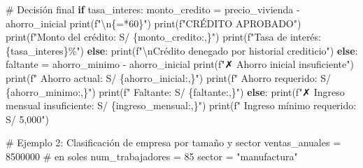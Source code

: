 \documentclass[
  doc,
  floatsintext,
  longtable,
  a4paper,
  nolmodern,
  notxfonts,
  notimes,
  12pt,
  colorlinks=true,linkcolor=blue,citecolor=blue,urlcolor=blue]{apa7}
\newenvironment{Shaded}{\begin{snugshade}}{\end{snugshade}}
\newcommand{\BuiltInTok}[1]{\textcolor[rgb]{0.00,0.23,0.31}{#1}}
\newcommand{\CharTok}[1]{\textcolor[rgb]{0.13,0.47,0.30}{#1}}
\newcommand{\CommentTok}[1]{\textcolor[rgb]{0.37,0.37,0.37}{#1}}
\newcommand{\ControlFlowTok}[1]{\textcolor[rgb]{0.00,0.23,0.31}{\textbf{#1}}}
\newcommand{\DecValTok}[1]{\textcolor[rgb]{0.68,0.00,0.00}{#1}}
\newcommand{\NormalTok}[1]{\textcolor[rgb]{0.00,0.23,0.31}{#1}}
\newcommand{\OperatorTok}[1]{\textcolor[rgb]{0.37,0.37,0.37}{#1}}
\newcommand{\SpecialCharTok}[1]{\textcolor[rgb]{0.37,0.37,0.37}{#1}}
\newcommand{\SpecialStringTok}[1]{\textcolor[rgb]{0.13,0.47,0.30}{#1}}
\newcommand{\StringTok}[1]{\textcolor[rgb]{0.13,0.47,0.30}{#1}}
\begin{document}
\begin{Shaded}
\begin{Highlighting}[]
        \CommentTok{\# Decisión final}
        \ControlFlowTok{if}\NormalTok{ tasa\_interes:}
\NormalTok{            monto\_credito }\OperatorTok{=}\NormalTok{ precio\_vivienda }\OperatorTok{{-}}\NormalTok{ ahorro\_inicial}
            \BuiltInTok{print}\NormalTok{(}\SpecialStringTok{f"}\CharTok{\textbackslash{}n}\SpecialCharTok{\{}\StringTok{\textquotesingle{}=\textquotesingle{}}\OperatorTok{*}\DecValTok{60}\SpecialCharTok{\}}\SpecialStringTok{"}\NormalTok{)}
            \BuiltInTok{print}\NormalTok{(}\SpecialStringTok{f"CRÉDITO APROBADO"}\NormalTok{)}
            \BuiltInTok{print}\NormalTok{(}\SpecialStringTok{f"Monto del crédito: S/ }\SpecialCharTok{\{}\NormalTok{monto\_credito}\SpecialCharTok{:,\}}\SpecialStringTok{"}\NormalTok{)}
            \BuiltInTok{print}\NormalTok{(}\SpecialStringTok{f"Tasa de interés: }\SpecialCharTok{\{}\NormalTok{tasa\_interes}\SpecialCharTok{\}}\SpecialStringTok{\%"}\NormalTok{)}
        \ControlFlowTok{else}\NormalTok{:}
            \BuiltInTok{print}\NormalTok{(}\SpecialStringTok{f"}\CharTok{\textbackslash{}n}\SpecialStringTok{Crédito denegado por historial crediticio"}\NormalTok{)}
    \ControlFlowTok{else}\NormalTok{:}
\NormalTok{        faltante }\OperatorTok{=}\NormalTok{ ahorro\_minimo }\OperatorTok{{-}}\NormalTok{ ahorro\_inicial}
        \BuiltInTok{print}\NormalTok{(}\SpecialStringTok{f"✗ Ahorro inicial insuficiente"}\NormalTok{)}
        \BuiltInTok{print}\NormalTok{(}\SpecialStringTok{f"  Ahorro actual: S/ }\SpecialCharTok{\{}\NormalTok{ahorro\_inicial}\SpecialCharTok{:,\}}\SpecialStringTok{"}\NormalTok{)}
        \BuiltInTok{print}\NormalTok{(}\SpecialStringTok{f"  Ahorro requerido: S/ }\SpecialCharTok{\{}\NormalTok{ahorro\_minimo}\SpecialCharTok{:,\}}\SpecialStringTok{"}\NormalTok{)}
        \BuiltInTok{print}\NormalTok{(}\SpecialStringTok{f"  Faltante: S/ }\SpecialCharTok{\{}\NormalTok{faltante}\SpecialCharTok{:,\}}\SpecialStringTok{"}\NormalTok{)}
\ControlFlowTok{else}\NormalTok{:}
    \BuiltInTok{print}\NormalTok{(}\SpecialStringTok{f"✗ Ingreso mensual insuficiente: S/ }\SpecialCharTok{\{}\NormalTok{ingreso\_mensual}\SpecialCharTok{:,\}}\SpecialStringTok{"}\NormalTok{)}
    \BuiltInTok{print}\NormalTok{(}\SpecialStringTok{f"  Ingreso mínimo requerido: S/ 5,000"}\NormalTok{)}

\CommentTok{\# Ejemplo 2: Clasificación de empresa por tamaño y sector}
\NormalTok{ventas\_anuales }\OperatorTok{=} \DecValTok{8500000}  \CommentTok{\# en soles}
\NormalTok{num\_trabajadores }\OperatorTok{=} \DecValTok{85}
\NormalTok{sector }\OperatorTok{=} \StringTok{"manufactura"}


\end{Highlighting}
\end{Shaded}
\end{document}
